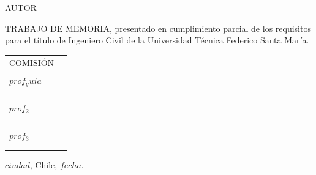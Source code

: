 \documentclass[$if(fontsize)$$fontsize$,$endif$$if(lang)$$babel-lang$,$endif$$if(papersize)$$papersize$paper,$endif$$for(classoption)$$classoption$$sep$,$endfor$]{$documentclass$}
\begin{document}
\vspace{25mm}

\noindent AUTOR

\vspace{5mm}


\vspace{20mm}

\noindent TRABAJO DE MEMORIA, presentado en cumplimiento parcial de
los requisitos para el título de Ingeniero Civil %
de la Universidad Técnica Federico Santa María.

\vspace{20mm}

\begin{tabular}{p{60mm}c}
COMISIÓN 
\vspace{2mm}
\\
$prof_guia$ & \rule{60mm}{1pt} \\
& \\
& \\
$prof_2$ & \rule{60mm}{1pt} \\
& \\
& \\
$prof_3$ & \rule{60mm}{1pt} \\
&
\end{tabular}

\vspace{30.5mm}

\hfill $ciudad$, Chile, $fecha$.

\cleardoublepage



\end{document}

